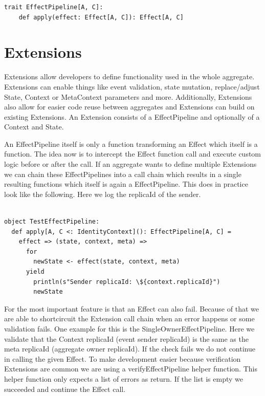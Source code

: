 \documentclass[
	ngerman,
	ruledheaders=section,   %
	class=report,		    %
	thesis={type=bachelor}, %
	accentcolor=9c,			%
	custommargins=true,    %
	marginpar=false,        %
	parskip=half-,          %
	fontsize=11pt,          %
]{tudapub}
\begin{document}
\begin{lstlisting}
trait EffectPipeline[A, C]:
	def apply(effect: Effect[A, C]): Effect[A, C]
\end{lstlisting}

\section{Extensions}
Extensions allow developers to define functionality used in the whole aggregate. Extensions can enable things like event validation, state mutation, replace/adjust State, Context or MetaContext parameters and more. Additionally, Extensions also allow for easier code reuse between aggregates and Extensions can build on existing Extensions. An Extension consists of a EffectPipeline and optionally of a Context and State. 

An EffectPipeline itself is only a function transforming an Effect which itself is a function. The idea now is to intercept the Effect function call and execute custom logic before or after the call. If an aggregate wants to define multiple Extensions we can chain these EffectPipelines into a call chain which results in a single resulting functions which itself is again a EffectPipeline. This does in practice look like the following. Here we log the replicaId of the sender.

\begin{lstlisting}

object TestEffectPipeline:
  def apply[A, C <: IdentityContext](): EffectPipeline[A, C] =
    effect => (state, context, meta) => 
      for
        newState <- effect(state, context, meta)
      yield
        println(s"Sender replicaId: \${context.replicaId}")
        newState

\end{lstlisting}

For the most important feature is that an Effect can also fail. Because of that we are able to shortcircuit the Extension call chain when an error happens or some validation fails. One example for this is the SingleOwnerEffectPipeline. Here we validate that the Context replicaId (event sender replicaId) is the same as the meta replicaId (aggregate owner replicaId). If the check fails we do not continue in calling the given Effect. To make development easier because verification Extensions are common we are using a verifyEffectPipeline helper function. This helper function only expects a list of errors as return. If the list is empty we succeeded and continue the Effect call.
\end{document}

